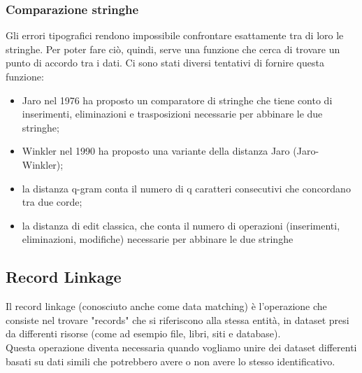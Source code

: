 \documentclass[a4paper,12pt]{article}
\begin{document}
\subsubsection{Comparazione stringhe}

Gli errori tipografici rendono impossibile confrontare esattamente tra di loro le stringhe.  Per poter fare ciò, quindi, serve una funzione che cerca di trovare un punto di accordo tra i dati. Ci sono stati diversi tentativi di fornire questa funzione:

\begin{itemize}
\item Jaro \cite{census/jaro76} nel 1976 ha proposto un comparatore di stringhe che tiene conto di inserimenti, eliminazioni e trasposizioni necessarie per abbinare le due stringhe;
\item Winkler \cite{winkler90} nel 1990 ha proposto una variante della distanza Jaro (Jaro-Winkler);
\item la distanza q-gram conta il numero di q caratteri consecutivi che concordano tra due corde;
\item la distanza di edit classica, che conta il numero di operazioni (inserimenti, eliminazioni, modifiche) necessarie per abbinare le due stringhe
\end{itemize}

\newpage
\subsection{Record Linkage}
Il record linkage (conosciuto anche come data matching) è l'operazione che consiste nel trovare "records" che si riferiscono alla stessa entità, in dataset presi da differenti risorse (come ad esempio file, libri, siti e database). \\
\noindent Questa operazione diventa necessaria quando vogliamo unire dei dataset differenti basati su dati simili che potrebbero avere o non avere lo stesso identificativo. \\
\end{document}
